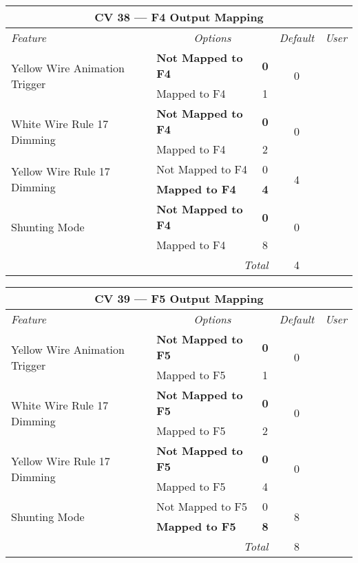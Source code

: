 \documentclass[12pt,letterpaper,draft]{memoir} %
\begin{document}
\label{CV38}
\begin{center}
\begin{tabular}{|l|lc|c|c|}
\hline
\multicolumn{5}{|c|}{\textbf{CV 38 --- F4 Output Mapping}} \\ \hline \hline
\textit{Feature} & \multicolumn{2}{c|}{\textit{Options}} & \textit{Default} & \textit{User} \\ \hline
\multirow{2}{*}{Yellow Wire Animation Trigger} & \textbf{Not Mapped to F4} & \textbf{0}	& 	\multirow{2}{*}{0}& \\
                           & Mapped to F4 & 1 & & \\ \hline
\multirow{2}{*}{White Wire Rule 17 Dimming} & \textbf{Not Mapped to F4} & \textbf{0}	& 	\multirow{2}{*}{0}& \\
                             & Mapped to F4 & 2 & & \\ \hline
\multirow{2}{*}{Yellow Wire Rule 17 Dimming} & Not Mapped to F4 & 0	& 	\multirow{2}{*}{4}&\\
                             & \textbf{Mapped to F4} & \textbf{4} & & \\ \hline
\multirow{2}{*}{Shunting Mode} & \textbf{Not Mapped to F4} & \textbf{0}	& 	\multirow{2}{*}{0}&\\
                             & Mapped to F4 & 8 & & \\ \hline\hline
\multicolumn{3}{|r|}{\textit{Total}} & 4 &\\ \hline
\end{tabular}
\end{center}

\label{CV39}
\begin{center}
\begin{tabular}{|l|lc|c|c|}
\hline
\multicolumn{5}{|c|}{\textbf{CV 39 --- F5 Output Mapping}} \\ \hline \hline
\textit{Feature} & \multicolumn{2}{c|}{\textit{Options}} & \textit{Default} & \textit{User} \\ \hline
\multirow{2}{*}{Yellow Wire Animation Trigger} & \textbf{Not Mapped to F5} & \textbf{0}	& 	\multirow{2}{*}{0}& \\
                           & Mapped to F5 & 1 & & \\ \hline
\multirow{2}{*}{White Wire Rule 17 Dimming} & \textbf{Not Mapped to F5} & \textbf{0}	& 	\multirow{2}{*}{0}& \\
                             & Mapped to F5 & 2 & & \\ \hline
\multirow{2}{*}{Yellow Wire Rule 17 Dimming} & \textbf{Not Mapped to F5} & \textbf{0}	& 	\multirow{2}{*}{0}&\\
                             & Mapped to F5 & 4 & & \\ \hline
\multirow{2}{*}{Shunting Mode} & Not Mapped to F5 & 0	& 	\multirow{2}{*}{8}&\\
                             & \textbf{Mapped to F5} & \textbf{8} & & \\ \hline\hline
\multicolumn{3}{|r|}{\textit{Total}} & 8 &\\ \hline
\end{tabular}
\end{center}
\end{document}
